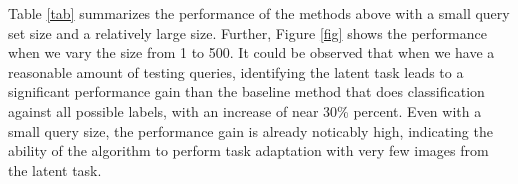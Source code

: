 \documentclass[10pt,twocolumn,letterpaper]{article}
\begin{document}
Table \ref{tab} summarizes the performance of the methods above with a small query set size and a relatively large size. Further, Figure \ref{fig} shows the performance when we vary the size from 1 to 500. It could be observed that when we have a reasonable amount of testing queries, identifying the latent task leads to a significant performance gain than the baseline method that does classification against all possible labels, with an increase of near 30\% percent. Even with a small query size, the performance gain is already noticably high, indicating the ability of the algorithm to perform task adaptation with very few images from the latent task.

{\small


}
\end{document}
